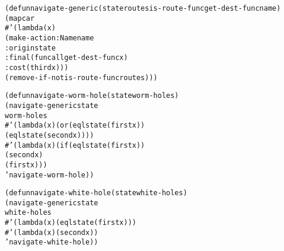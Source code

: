 \begin{aibox}{\code}
\begin{alltt}

(defun navigate-generic (state routes is-route-func get-dest-func name)
  (mapcar 
    \#'(lambda (x)
       (make-action :Name name
                    :origin state
                    :final (funcall get-dest-func x)
                    :cost (third x)))
       (remove-if-not is-route-func routes)))

(defun navigate-worm-hole (state worm-holes) 
  (navigate-generic state 
                    worm-holes
                    \#'(lambda (x) (or (eql state (first x)) 
                                      (eql state (second x))))
                    \#'(lambda (x) (if (eql state (first x)) 
                                      (second x)
                                      (first x)))
                    'navigate-worm-hole)) 

(defun navigate-white-hole (state white-holes)
  (navigate-generic state 
                    white-holes
                    \#'(lambda (x) (eql state (first x)))
                    \#'(lambda (x) (second x))
                    'navigate-white-hole))




\end{alltt}
\end{aibox}
